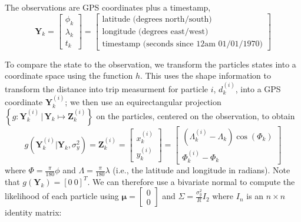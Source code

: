 \documentclass[14paper,twoside]{article}
\newcommand{\bY}{\mathbf{Y}}
\newcommand{\bZ}{\mathbf{Z}}
\newcommand{\g}[1]{g\left(#1\right)}
\begin{document}
The observations are GPS coordinates plus a timestamp,
\begin{equation}
  \label{eq:vehicle_observation}
  \bY_k =
  \begin{bmatrix}
    \phi_k \\ \lambda_k \\ t_k
  \end{bmatrix} =
  \left[
    \begin{array}{l}
      \text{latitude (degrees north/south)} \\
      \text{longitude (degrees east/west)} \\
      \text{timestamp (seconds since 12am 01/01/1970)}
    \end{array}
  \right]
\end{equation}


To compare the state to the observation, 
we transform the particles states into a coordinate space using the function $h$.
This uses the shape information to transform the distance into trip measurment for particle $i$, $d_k^{(i)}$,
into a GPS coordinate $\bY_k^{(i)}$;
we then use an equirectangular projection 
$\left\{g : \bY_k^{(i)} \,|\, \bY_k \mapsto \bZ_k^{(i)} \right\}$ 
on the particles, centered on the observation, to obtain 
\begin{equation}
  \label{eq:transform}
  \g{\bY_k^{(i)} | \bY_k, \sigma^2_y} = \bZ_k^{(i)} =
  \begin{bmatrix}
    x_k^{(i)} \\ y_k^{(i)}
  \end{bmatrix} =
  \begin{bmatrix}
    \left( \Lambda_k^{(i)} - \Lambda_k \right) \cos \left( \Phi_k \right) \\
    \Phi_k^{(i)} - \Phi_k
  \end{bmatrix}
\end{equation}
where $\Phi = \frac{\pi}{180} \phi$ and $\Lambda = \frac{\pi}{180} \lambda$ 
(i.e., the latitude and longitude in radians).
Note that $g(\bY_k) = \left[0\ 0\right]^T$.
We can therefore use a bivariate normal to compute the likelihood of each particle
using $\boldsymbol{\mu} = \begin{bmatrix} 0 \\ 0 \end{bmatrix}$
and $\Sigma = \frac{\sigma^2_y}{R} I_2$ where $I_n$ is an $n\times n$ identity matrix:
\end{document}
